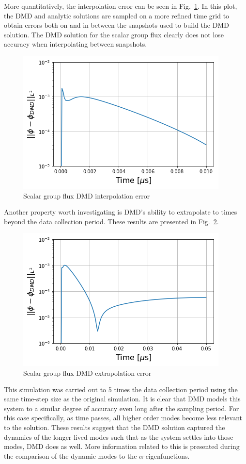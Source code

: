 \documentclass{style/nseJournal}
\newcommand{\LFI}[1]{\label{fi:#1}}
\newcommand{\FI}[1]{Fig.~\ref{fi:#1}}
\newcommand{\bfg}{\begin{figure}}
\newcommand{\efg}{\end{figure}}
\begin{document}
More quantitatively, the interpolation error can be seen in \FI{interp-flux}.  
In this plot, the DMD and analytic solutions are sampled on a more refined time grid to obtain errors both on and in between the snapshots used to build the DMD solution.  
The DMD solution for the scalar group flux clearly does not lose accuracy when interpolating between snapshots.  
\bfg[!htb] \centering
	\includegraphics[scale=0.5]{figures/flux_interp_error.png}
	\caption{Scalar group flux DMD interpolation error}
	\LFI{interp-flux}
\efg
Another property worth investigating is DMD's ability to extrapolate to times beyond the data collection period.  
These results are presented in \FI{extrap-flux}.  
\bfg[!htb] \centering
	\includegraphics[scale=0.5]{figures/flux_extrap_error.png}
	\caption{Scalar group flux DMD extrapolation error}
	\LFI{extrap-flux}
\efg
This simulation was carried out to 5 times the data collection period using the same time-step size as the original simulation.  
It is clear that DMD models this system to a similar degree of accuracy even long after the sampling period.  
For this case specifically, as time passes, all higher order modes become less relevant to the solution.  
These results suggest that the DMD solution captured the dynamics of the longer lived modes such that as the system settles into those modes, DMD does as well.  
More information related to this is presented during the comparison of the dynamic modes to the $\alpha$-eigenfunctions.  
\end{document}
